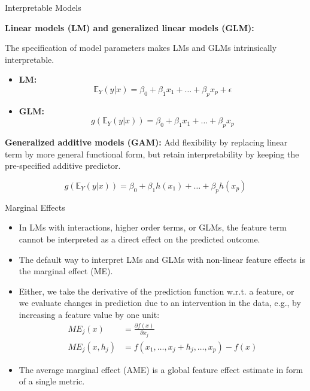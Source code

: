 \documentclass[11pt,compress,t,notes=noshow, xcolor=table]{beamer}
\begin{document}
\begin{vbframe}{Interpretable Models}


\textbf{Linear models (LM) and generalized linear models (GLM):}

The specification of model parameters makes LMs and GLMs intrinsically interpretable.

\begin{itemize}

\item \textbf{LM:}
$$
\mathbb{E}_Y(y \vert x) = \beta_0 + \beta_1 x_1 + \dots + \beta_p x_p + \epsilon
$$

\item \textbf{GLM:}
$$
g\left(\mathbb{E}_Y(y \vert x)\right) = \beta_0 + \beta_1 x_1 + \dots + \beta_p x_p
$$
\end{itemize}


\textbf{Generalized additive models (GAM):} Add flexibility by replacing linear term by more general functional form, but retain interpretability by keeping the pre-specified additive predictor.

$$
g\left(\mathbb{E}_Y(y \vert x)\right) = \beta_0 + \beta_1 h(x_1) + \dots + \beta_p h(x_p)
$$

\end{vbframe}

\begin{vbframe}{Marginal Effects}

\begin{itemize}
\item In LMs with interactions, higher order terms, or GLMs, the feature term cannot be interpreted as a direct effect on the predicted outcome.
\item The default way to interpret LMs and GLMs with non-linear feature effects is the marginal effect (ME).
\item Either, we take the derivative of the prediction function w.r.t. a feature, or we evaluate changes in prediction due to an intervention in the data, e.g., by increasing a feature value by one unit:
\begin{align*}
ME_j(x) &= \frac{\partial f(x)}{\partial x_j} \\
ME_j(x, h_j) &= f(x_1, \dots, x_j + h_j, \dots, x_p) - f(x)
\end{align*}
\item The average marginal effect (AME) is a global feature effect estimate in form of a single metric. 
\end{itemize}


\end{vbframe}
\end{document}

